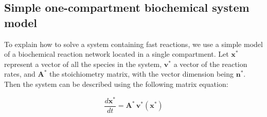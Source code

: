 \subsection*{Simple one-compartment biochemical system model}

\newcommand{\Abold}{\ensuremath{\mathbf{A}}}
\newcommand{\Bbold}{\ensuremath{\mathbf{B}}}
\newcommand{\nbold}{\ensuremath{\mathbf{n}}}
\newcommand{\vbold}{\ensuremath{\mathbf{v}}}
\newcommand{\xbold}{\ensuremath{\mathbf{x}}}

\newcommand{\Astar}{\ensuremath{\Abold^{\!*}}}
\newcommand{\nstar}{\ensuremath{\nbold^*}}
\newcommand{\vstar}{\ensuremath{\vbold^*}}
\newcommand{\xstar}{\ensuremath{\xbold^*}}

\newcommand{\xs}{\xstar\xspace}
\newcommand{\xb}{\xbold\xspace}
\newcommand{\vs}{\vstar\xspace}
\newcommand{\vb}{\vbold\xspace}
\newcommand{\ns}{\nstar\xspace}
\newcommand{\As}{\Astar\xspace}
\newcommand{\Ab}{\Abold\xspace}
\newcommand{\Bb}{\Bbold\xspace}

\newcommand{\boldN}{\ensuremath{\mathbf{N}}}
\newcommand{\bN}{\boldN\xspace}
\newcommand{\boldm}{\ensuremath{\mathbf{m}}}
\newcommand{\bm}{\boldm\xspace}

To explain how to solve a system containing fast reactions, we use
a simple model of a biochemical reaction network located in a
single compartment.  Let \xs represent a vector of all the species
in the system, \vs a vector of the reaction rates, and \As the
stoichiometry matrix, with the vector dimension being \ns.  Then
the system can be described using the following matrix equation:
\begin{linenomath}
\begin{equation*}
  \frac{d\xstar}{dt} = \Astar \, \vstar (\xstar) 
\end{equation*}
\end{linenomath}

